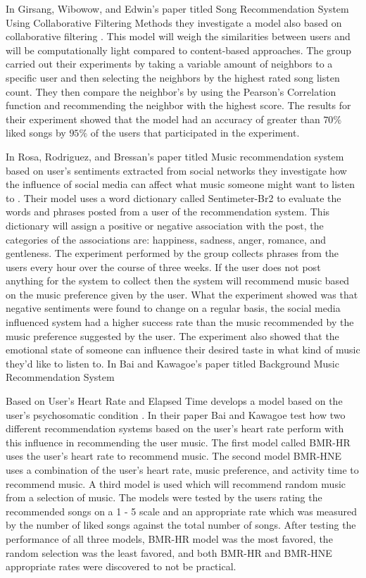 \documentclass[letterpaper, 10 pt, conference]{ieeeconf}
\begin{document}
In Girsang, Wibowow, and Edwin’s paper titled Song Recommendation System Using Collaborative Filtering Methods they investigate a model also based on collaborative filtering \cite{four}. This model will weigh the similarities between users and will be computationally light compared to content-based approaches. The group carried out their experiments by taking a variable amount of neighbors to a specific user and then selecting the neighbors by the highest rated song listen count. They then compare the neighbor’s by using the Pearson’s Correlation function and recommending the neighbor with the highest score. The results for their experiment showed that the model had an accuracy of greater than $70\%$ liked songs by $95\%$ of the users that participated in the experiment.

In Rosa, Rodriguez, and Bressan’s paper titled Music recommendation system based on user's sentiments extracted from social networks they investigate how the influence of social media can affect what music someone might want to listen to \cite{five}. Their model uses a word dictionary called Sentimeter-Br2 to evaluate the words and phrases posted from a user of the recommendation system. This dictionary will assign a positive or negative association with the post, the categories of the associations are: happiness, sadness, anger, romance, and gentleness. The experiment performed by the group collects phrases from the users every hour over the course of three weeks. If the user does not post anything for the system to collect then the system will recommend music based on the music preference given by the user. What the experiment showed was that negative sentiments were found to change on a regular basis, the social media influenced system had a higher success rate than the music recommended by the music preference suggested by the user. The experiment also showed that the emotional state of someone can influence their desired taste in what kind of music they’d like to listen to.
In Bai and Kawagoe’s paper titled Background Music Recommendation System

Based on User's Heart Rate and Elapsed Time develops a model based on the user’s psychosomatic condition \cite{six}. In their paper Bai and Kawagoe test how two different recommendation systems based on the user’s heart rate perform with this influence in recommending the user music. The first model called BMR-HR uses the user’s heart rate to recommend music. The second model BMR-HNE uses a combination of the user’s heart rate, music preference, and activity time to recommend music. A third model is used which will recommend random music from a selection of music. The models were tested by the users rating the recommended songs on a 1 - 5 scale and an appropriate rate which was measured by the number of liked songs against the total number of songs. After testing the performance of all three models, BMR-HR model was the most favored, the random selection was the least favored, and both BMR-HR and BMR-HNE appropriate rates were discovered to not be practical.
\end{document}
